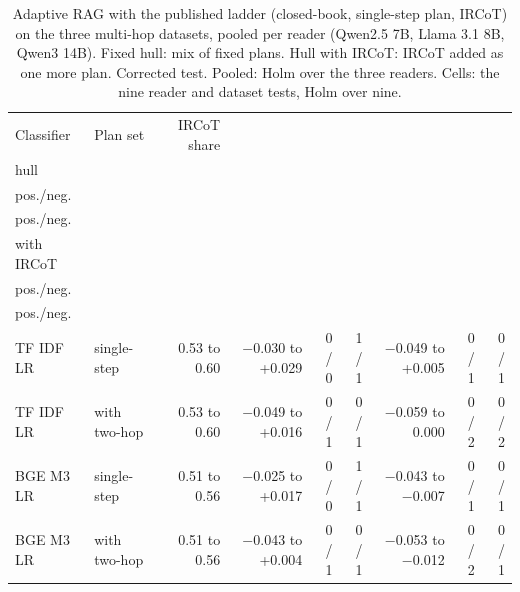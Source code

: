\begin{table}[t]
\centering\small
\setlength{\tabcolsep}{4pt}
\caption{Adaptive RAG with the published ladder (closed-book, single-step plan, IRCoT) on the three multi-hop datasets, pooled per reader (Qwen2.5 7B, Llama 3.1 8B, Qwen3 14B). Fixed hull: mix of fixed plans. Hull with IRCoT: IRCoT added as one more plan. Corrected test. Pooled: Holm over the three readers. Cells: the nine reader and dataset tests, Holm over nine.}
\label{tab:rev2_arircot}
\begin{tabular*}{\linewidth}{@{\extracolsep{\fill}}llrrrrrrr}
\toprule
Classifier & Plan set & IRCoT share & \begin{tabular}[b]{@{}r@{}}Gain, fixed \\ hull\end{tabular} & \begin{tabular}[b]{@{}r@{}}Pooled \\ pos./neg.\end{tabular} & \begin{tabular}[b]{@{}r@{}}Cells \\ pos./neg.\end{tabular} & \begin{tabular}[b]{@{}r@{}}Gain, hull \\ with IRCoT\end{tabular} & \begin{tabular}[b]{@{}r@{}}Pooled \\ pos./neg. \end{tabular} & \begin{tabular}[b]{@{}r@{}}Cells \\ pos./neg. \end{tabular} \\
\midrule
TF IDF LR & single-step & 0.53 to 0.60 & $-$0.030 to +0.029 & 0 / 0 & 1 / 1 & $-$0.049 to +0.005 & 0 / 1 & 0 / 1 \\
TF IDF LR & with two-hop & 0.53 to 0.60 & $-$0.049 to +0.016 & 0 / 1 & 0 / 1 & $-$0.059 to 0.000 & 0 / 2 & 0 / 2 \\
BGE M3 LR & single-step & 0.51 to 0.56 & $-$0.025 to +0.017 & 0 / 0 & 1 / 1 & $-$0.043 to $-$0.007 & 0 / 1 & 0 / 1 \\
BGE M3 LR & with two-hop & 0.51 to 0.56 & $-$0.043 to +0.004 & 0 / 1 & 0 / 1 & $-$0.053 to $-$0.012 & 0 / 2 & 0 / 1 \\
\bottomrule
\end{tabular*}
\end{table}
